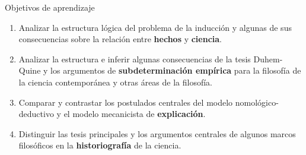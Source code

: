 \documentclass[%
  9pt,
  spanish, %
  ignorenonframetext,
  aspectratio=169, %
]{beamer}
\providecommand{\tightlist}{}
\begin{document}
\begin{frame}{Objetivos de aprendizaje}
  \protect{}\label{objetivos-de-aprendizaje}
  \begin{enumerate}
      \tightlist
    \item
      Analizar la estructura lógica del problema de la inducción y algunas
      de sus consecuencias sobre la relación entre \textbf{hechos} y
      \textbf{ciencia}.
    \item
      Analizar la estructura e inferir algunas consecuencias de la tesis
      Duhem-Quine y los argumentos de \textbf{subdeterminación empírica}
      para la filosofía de la ciencia contemporánea y otras áreas de la
      filosofía.
    \item
      Comparar y contrastar los postulados centrales del modelo
      nomológico-deductivo y el modelo mecanicista de \textbf{explicación}.
    \item
      Distinguir las tesis principales y los argumentos centrales de algunos
      marcos filosóficos en la \textbf{historiografía} de la ciencia.
  \end{enumerate}
\end{frame}
\end{document}
